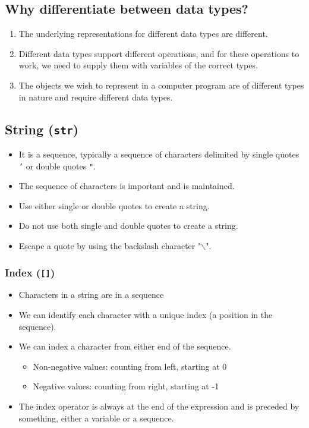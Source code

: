 \documentclass[11pt]{article}
\begin{document}
\subsection{Why differentiate between data types?}
\label{sec:org6207a9d}
\begin{enumerate}
\item The underlying representations for different data types are different.
\item Different data types support different operations, and for these operations to work, we need to supply them with variables of the correct types.
\item The objects we wish to represent in a computer program are of different types in nature and require different data types.
\end{enumerate}

\subsection{String (\texttt{str})}
\label{sec:org448bd46}
\begin{itemize}
\item It is a sequence, typically a sequence of characters delimited by single quotes \texttt{'} or double quotes \texttt{"}.
\item The sequence of characters is important and is maintained.
\item Use either single or double quotes to create a string.
\item Do not use both single and double quotes to create a string.
\item Escape a quote by using the backslash character "$\backslash$".
\end{itemize}

 \newpage

\subsubsection{Index (\texttt{[]})}
\label{sec:org86b9da8}
\begin{itemize}
\item Characters in a string are in a sequence
\item We can identify each character with a unique index (a position in the sequence).
\item We can index a character from either end of the sequence.
\begin{itemize}
\item Non-negative values: counting from left, starting at 0
\item Negative values: counting from right, starting at -1
\end{itemize}
\item The index operator is always at the end of the expression and is preceded by something, either a variable or a sequence.
\end{itemize}
\end{document}
